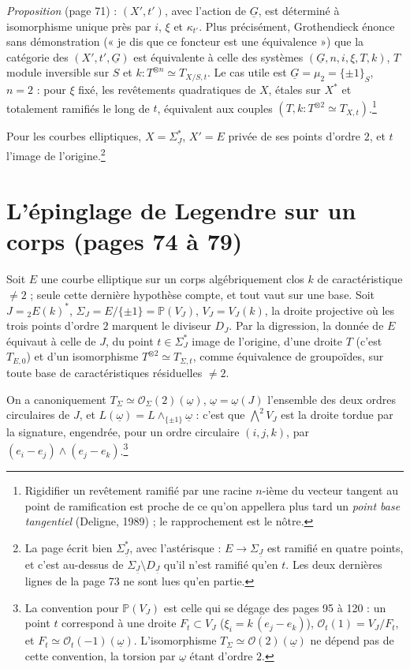 \documentclass[11pt,a4paper]{article}
\begin{document}
\emph{Proposition} (page 71) : $(X', t')$, avec l'action de $\underline{G}$, est
déterminé à isomorphisme unique près par $i$, $\xi$ et $\kappa_{t'}$.
Plus précisément, Grothendieck énonce sans démonstration
(« je dis que ce foncteur est une équivalence ») que la catégorie des $(X', t',
\underline{G})$ est équivalente à celle des systèmes $(\underline{G}, n, i, \xi,
T, k)$, $T$ module inversible sur $S$ et $k : T^{\otimes n} \simeq T_{X/S,t}$.
Le cas utile est $\underline{G} = \mu_2 = \{\pm 1\}_S$, $n = 2$ : pour $\xi$
fixé, les revêtements quadratiques de $X$, étales sur $X^{*}$ et totalement
ramifiés le long de $t$, équivalent aux couples $(T, k : T^{\otimes 2} \simeq
T_{X,t})$.\footnote{Rigidifier un revêtement ramifié par une racine $n$-ième du
vecteur tangent au point de ramification est proche de ce qu'on appellera plus
tard un \emph{point base tangentiel} (Deligne, 1989) ; le rapprochement est le
nôtre.}

Pour les courbes elliptiques, $X = \Sigma^{*}_{\underline{J}}$, $X' = E$ privée
de ses points d'ordre $2$, et $t$ l'image de l'origine.\footnote{La page écrit
bien $\Sigma^{*}_{\underline{J}}$, avec l'astérisque : $E \to \Sigma_{\underline{J}}$
est ramifié en quatre points, et c'est au-dessus de $\Sigma_{\underline{J}}
\setminus D_{\underline{J}}$ qu'il n'est ramifié qu'en $t$. Les deux dernières
lignes de la page 73 ne sont lues qu'en partie.}

\section*{L'épinglage de Legendre sur un corps (pages 74 à 79)}

Soit $E$ une courbe elliptique sur un corps algébriquement clos $k$ de
caractéristique $\neq 2$ ; seule cette dernière hypothèse compte, et tout vaut
sur une base. Soit $J = {}_2E(k)^{*}$, $\Sigma_J = E/\{\pm 1\} = \mathbb{P}(V_J)$,
$V_J = V_J(k)$, la droite projective où les trois points d'ordre $2$ marquent
le diviseur $D_J$. Par la digression, la donnée de $E$ équivaut à celle de $J$,
du point $t \in \Sigma^{*}_J$ image de l'origine, d'une droite $T$ (c'est
$T_{E,0}$) et d'un isomorphisme $T^{\otimes 2} \simeq T_{\Sigma, t}$, comme
équivalence de groupoïdes, sur toute base de caractéristiques résiduelles
$\neq 2$.

On a canoniquement $T_\Sigma \simeq \mathcal{O}_\Sigma(2)(\underline{\omega})$,
$\underline{\omega} = \underline{\omega}(J)$ l'ensemble des deux ordres
circulaires de $J$, et $L(\underline{\omega}) = L \wedge_{\{\pm 1\}}
\underline{\omega}$ : c'est que $\bigwedge^2 V_J$ est la droite tordue par la
signature, engendrée, pour un ordre circulaire $(i, j, k)$, par $(e_i - e_j)
\wedge (e_j - e_k)$.\footnote{La convention pour $\mathbb{P}(V_J)$ est celle
qui se dégage des pages 95 à 120 : un point $t$ correspond à une droite $F_t
\subset V_J$ ($\xi_i = k\,(e_j - e_k)$), $\mathcal{O}_t(1) = V_J / F_t$, et
$F_t \simeq \mathcal{O}_t(-1)(\underline{\omega})$. L'isomorphisme $T_\Sigma \simeq
\mathcal{O}(2)(\underline{\omega})$ ne dépend pas de cette convention, la
torsion par $\underline{\omega}$ étant d'ordre $2$.}
\end{document}
